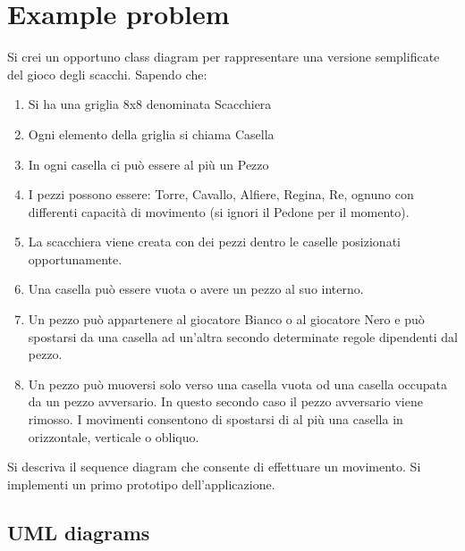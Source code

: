 \documentclass{article}
\begin{document}
\section{Example problem}

Si crei un opportuno class diagram per rappresentare una versione semplificate del gioco degli scacchi. Sapendo che:

\begin{enumerate}
\item Si ha una griglia 8x8 denominata Scacchiera 

\item Ogni elemento della griglia si chiama Casella 

\item In ogni casella ci pu\`o essere al pi\`u un Pezzo 

\item I pezzi possono essere: Torre, Cavallo, Alfiere, Regina, Re, ognuno con differenti 
capacit\`a di movimento (si ignori il Pedone per il momento). 

\item La scacchiera viene creata con dei pezzi dentro le caselle posizionati 
opportunamente. 

\item Una casella pu\`o essere vuota o avere un pezzo al suo interno. 

\item Un pezzo pu\`o appartenere al giocatore Bianco o al giocatore Nero e pu\`o spostarsi 
da una casella ad un’altra secondo determinate regole dipendenti dal pezzo. 

\item Un pezzo pu\`o muoversi solo verso una casella vuota od una casella occupata da 
un pezzo avversario. In questo secondo caso il pezzo avversario viene rimosso. I movimenti consentono di spostarsi di al pi\`u una casella in orizzontale, verticale o obliquo.
\end{enumerate}

Si descriva il sequence diagram che consente di effettuare un movimento.
Si implementi un primo prototipo dell'applicazione.

\subsection{UML diagrams}
\end{document}
